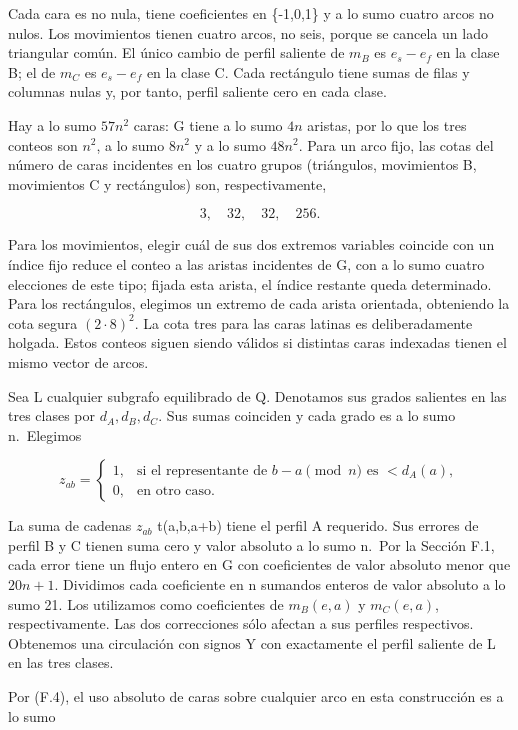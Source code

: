 \documentclass[spanish,11pt,a4paper]{article}
\begin{document}
Cada cara es no nula, tiene coeficientes en \{-1,0,1\} y a lo sumo cuatro arcos no nulos. Los movimientos tienen cuatro arcos, no seis, porque se cancela un lado triangular común. El único cambio de perfil saliente de \(m_{B}\) es \(e_{s}-e_{f}\) en la clase B; el de \(m_{C}\) es \(e_{s}-e_{f}\) en la clase C. Cada rectángulo tiene sumas de filas y columnas nulas y, por tanto, perfil saliente cero en cada clase.

Hay a lo sumo \(57n^{2}\) caras: G tiene a lo sumo \(4n\) aristas, por lo que los tres conteos son \(n^{2}\), a lo sumo \(8n^{2}\) y a lo sumo \(48n^{2}\). Para un arco fijo, las cotas del número de caras incidentes en los cuatro grupos (triángulos, movimientos B, movimientos C y rectángulos) son, respectivamente,

\[3,\quad32,\quad32,\quad256.\tag{F.4}\]

Para los movimientos, elegir cuál de sus dos extremos variables coincide con un índice fijo reduce el conteo a las aristas incidentes de G, con a lo sumo cuatro elecciones de este tipo; fijada esta arista, el índice restante queda determinado. Para los rectángulos, elegimos un extremo de cada arista orientada, obteniendo la cota segura \((2\cdot 8)^{2}\). La cota tres para las caras latinas es deliberadamente holgada. Estos conteos siguen siendo válidos si distintas caras indexadas tienen el mismo vector de arcos.

Sea L cualquier subgrafo equilibrado de Q. Denotamos sus grados salientes en las tres clases por \(d_{A},d_{B},d_{C}\). Sus sumas coinciden y cada grado es a lo sumo n.~Elegimos

\[z_{ab}=\begin{cases}1,&\text{si el representante de }b-a\pmod n\text{ es }<d_A(a),\\0,&\text{en otro caso.}\end{cases}\]

La suma de cadenas \(z_{ab}\) t(a,b,a+b) tiene el perfil A requerido. Sus errores de perfil B y C tienen suma cero y valor absoluto a lo sumo n.~Por la Sección F.1, cada error tiene un flujo entero en G con coeficientes de valor absoluto menor que \(20n+1\). Dividimos cada coeficiente en n sumandos enteros de valor absoluto a lo sumo 21. Los utilizamos como coeficientes de \(m_{B}(e,a)\) y \(m_{C}(e,a)\), respectivamente. Las dos correcciones sólo afectan a sus perfiles respectivos. Obtenemos una circulación con signos Y con exactamente el perfil saliente de L en las tres clases.

Por (F.4), el uso absoluto de caras sobre cualquier arco en esta construcción es a lo sumo
\end{document}
